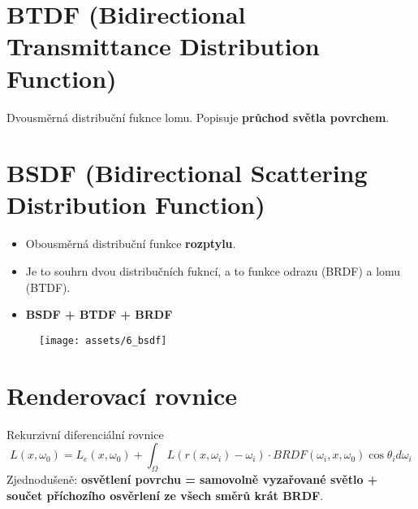 \section{BTDF (Bidirectional Transmittance Distribution Function)}
Dvousměrná distribuční fuknce lomu. Popisuje \textbf{průchod světla povrchem}.

\section{BSDF (Bidirectional Scattering Distribution Function)}
\begin{itemize}
    \item Obousměrná distribuční funkce \textbf{rozptylu}.
    \item Je to souhrn dvou distribučních fukncí, a to funkce odrazu (BRDF) a lomu (BTDF).
    \item \textbf{BSDF + BTDF + BRDF}
\end{itemize}
\begin{figure}[H]
    \centering
    \texttt{[image: assets/6\_bsdf]}
\end{figure}


\section{Renderovací rovnice}
Rekurzivní diferenciální rovnice
\begin{equation*}
    L(x, \omega_0) = L_e(x,\omega_0) + \int_{\Omega} L(r(x,\omega_i) - \omega_i) \cdot BRDF(\omega_i,x,\omega_0) \cos{\theta_id\omega_i}
\end{equation*}
Zjednodušeně: \textbf{osvětlení povrchu = samovolně vyzařované světlo + součet příchozího osvěrlení ze všech směrů krát BRDF}.